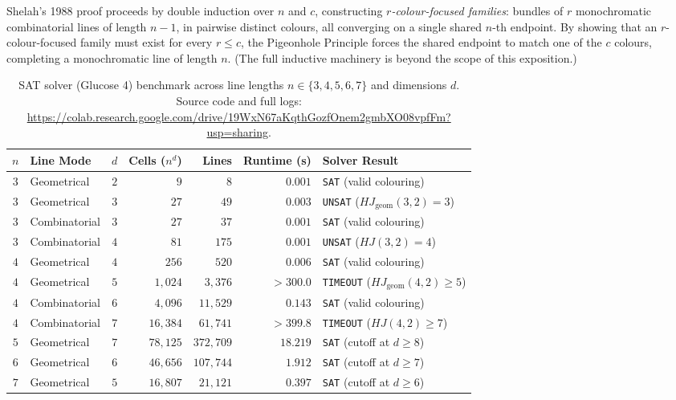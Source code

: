\documentclass[11pt, a4paper]{article}
\begin{document}
Shelah's 1988 proof proceeds by double induction over $n$ and $c$, constructing \emph{$r$-colour-focused families}: bundles of $r$ monochromatic combinatorial lines of length $n - 1$, in pairwise distinct colours, all converging on a single shared $n$-th endpoint. By showing that an $r$-colour-focused family must exist for every $r \le c$, the Pigeonhole Principle forces the shared endpoint to match one of the $c$ colours, completing a monochromatic line of length $n$. (The full inductive machinery is beyond the scope of this exposition.)

\begin{table}[htbp]
  \centering
  \caption{SAT solver (Glucose 4) benchmark across line lengths $n \in \{3, 4, 5, 6, 7\}$ and dimensions $d$. Source code and full logs: \url{https://colab.research.google.com/drive/19WxN67aKqthGozfOnem2gmbXO08vpfFm?usp=sharing}.}
  \label{tab:sat_benchmark}
  \begin{tabular}{@{}clrrrrl@{}}
    \toprule
    $n$ & Line Mode & $d$ & Cells ($n^d$) & Lines & Runtime (s) & Solver Result \\
    \midrule
    $3$ & Geometrical   & $2$ & $9$     & $8$      & $0.001$   & \texttt{SAT} (valid colouring) \\
    $3$ & Geometrical   & $3$ & $27$    & $49$     & $0.003$   & \texttt{UNSAT} ($HJ_{\mathrm{geom}}(3,2) = 3$) \\
    $3$ & Combinatorial & $3$ & $27$    & $37$     & $0.001$   & \texttt{SAT} (valid colouring) \\
    $3$ & Combinatorial & $4$ & $81$    & $175$    & $0.001$   & \texttt{UNSAT} ($HJ(3,2) = 4$) \\
    \midrule
    $4$ & Geometrical   & $4$ & $256$   & $520$    & $0.006$   & \texttt{SAT} (valid colouring) \\
    $4$ & Geometrical   & $5$ & $1{,}024$  & $3{,}376$   & $>300.0$  & \texttt{TIMEOUT} ($HJ_{\mathrm{geom}}(4,2) \ge 5$) \\
    $4$ & Combinatorial & $6$ & $4{,}096$  & $11{,}529$  & $0.143$   & \texttt{SAT} (valid colouring) \\
    $4$ & Combinatorial & $7$ & $16{,}384$ & $61{,}741$  & $>399.8$  & \texttt{TIMEOUT} ($HJ(4,2) \ge 7$) \\
    \midrule
    $5$ & Geometrical   & $7$ & $78{,}125$ & $372{,}709$ & $18.219$  & \texttt{SAT} (cutoff at $d \ge 8$) \\
    $6$ & Geometrical   & $6$ & $46{,}656$ & $107{,}744$ & $1.912$   & \texttt{SAT} (cutoff at $d \ge 7$) \\
    $7$ & Geometrical   & $5$ & $16{,}807$ & $21{,}121$  & $0.397$   & \texttt{SAT} (cutoff at $d \ge 6$) \\
    \bottomrule
  \end{tabular}
\end{table}
\end{document}
